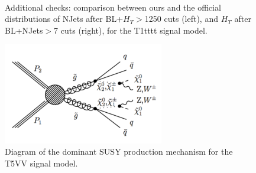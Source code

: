         \begin{figure}
        \centering
        \hspace{-1 cm}
        ~ %
        \caption{Additional checks: comparison between ours and the official distributions of NJets after BL+$H_T$$>$1250 cuts (left), and $H_T$ after BL+NJets$>$7 cuts (right), for the T1tttt signal model.}
        \end{figure}  
        

\clearpage

\begin{figure}[h!]
\centering
\includegraphics[width=7cm]{figures/Appendices/Ma5ValidationSUS13012/T5VV.pdf}
\caption{Diagram of the dominant SUSY production mechanism
for the T5VV signal model.}
\label{fig:T5VV}
\end{figure}

